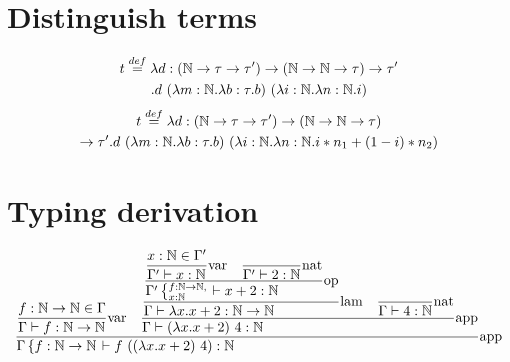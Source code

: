 \documentclass{article}
\newcommand{\st}[3][]{\ensuremath{\displaystyle\frac{#3\hfill}{#2\hfill} \text{#1}}}
\newcommand{\N}{\ensuremath \mathbb N}
\newcommand{\lam}[2]{\ensuremath{\lambda#1.#2}}
\begin{document}
\section{Distinguish terms}
\begin{multline*}
    t\overset{def}=\lam{d:(\N\to\tau\to\tau')\to(\N\to\N\to\tau)\to\tau'\\}{d\ (\lam{m:\N}{\lam{b:\tau}{b}})\ (\lam{i:\N}{\lam{n:\N}{i}})}
\end{multline*}
\begin{multline*}
    t\overset{def}=\lam{d:(\N\to\tau\to\tau')\to(\N\to\N\to\tau)\\\to\tau'}{d\ (\lam{m:\N}{\lam{b:\tau}{b}})\ (\lam{i:\N}{\lam{n:\N}{i*n_1+(1-i)*n_2}})}
\end{multline*}

\section{Typing derivation}
\begin{equation*}
    \st[app]{
        \Gamma\left\{f:\N\to\N\right. \vdash f\ ((\lam{x}{x+2})\ 4): \N
    }{
        \st[var]{
            \Gamma \vdash f:\N\to\N
        }{
            f:\N\to\N \in \Gamma
        }
        \quad
        \st[app]{
            \Gamma\vdash (\lam{x}{x+2})\ 4: \N
        }{
            \st[lam]{
                \Gamma\vdash \lam{x}{x+2}:\N\to\N
            }{
                \st[op]{
                    \Gamma'\left\{\substack{f:\N\to\N\hfill,\\x:\N\hfill}\right.\vdash x+2:\N
                }{
                    \st[var]{
                        \Gamma'\vdash x:\N
                    }{
                        x:\N\in\Gamma'
                    }
                    \quad
                    \st[nat]{
                        \Gamma'\vdash 2:\N
                    }{
                    }
                }
            }
            \quad
            \st[nat]{
                \Gamma\vdash 4:\N
            }{}
        }
    }
\end{equation*}
\end{document}
